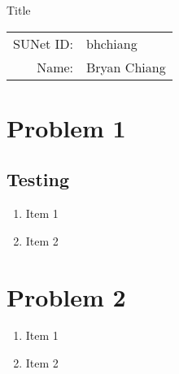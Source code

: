 \documentclass[]{article}
\begin{document}
\begin{center}
{\Large Title}

\begin{tabular}{rl} 
  \\
SUNet ID: & bhchiang \\
Name: & Bryan Chiang \\
\end{tabular}
\end{center}

\section{Problem 1}
\subsection{Testing}
\begin{enumerate}[label=(\alph*)]
  \item Item 1
  \item Item 2
\end{enumerate}

\section{Problem 2}


\begin{enumerate}[label=(\alph*)]
  \item Item 1
  \item Item 2

\end{enumerate}
\end{document}
